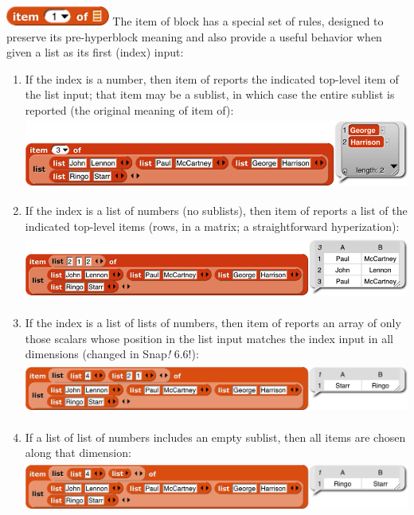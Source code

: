 \includegraphics[width=1.34in,height=0.25in]{media/image204.png} The
item of block has a special set of rules, designed to preserve its
pre-hyperblock meaning and also provide a useful behavior when given a
list as its first (index) input:

\begin{enumerate}
\def\labelenumi{\arabic{enumi}.}
\item
  If the index is a number, then item of reports the indicated top-level
  item of the list input; that item may be a sublist, in which case the
  entire sublist is reported (the original meaning of item
  of):\includegraphics[width=5.50694in,height=0.91667in]{media/image623.png}
\item
  If the index is a list of numbers (no sublists), then item of reports
  a list of the indicated top-level items (rows, in a matrix; a
  straightforward hyperization):
  \includegraphics[width=6.00694in,height=0.86806in]{media/image624.png}
\item
  If the index is a list of lists of numbers, then item of reports an
  array of only those scalars whose position in the list input matches
  the index input in all dimensions (changed in Snap\emph{!}
  6.6!):\includegraphics[width=6.00694in,height=0.6875in]{media/image625.png}
\item
  If a list of list of numbers includes an empty sublist, then all items
  are chosen along that
  dimension:\includegraphics[width=6.00694in,height=0.6875in]{media/image626.png}
\end{enumerate}

